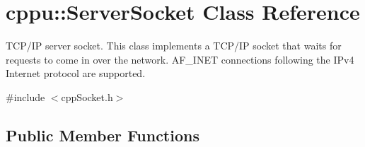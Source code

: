 \hypertarget{classcppu_1_1ServerSocket}{}\section{cppu\+:\+:Server\+Socket Class Reference}
\label{classcppu_1_1ServerSocket}


T\+C\+P/\+I\+P server socket. This class implements a T\+C\+P/\+I\+P socket that waits for requests to come in over the network. A\+F\+\_\+\+I\+N\+E\+T connections following the I\+Pv4 Internet protocol are supported.  




{\ttfamily \#include $<$cpp\+Socket.\+h$>$}

\subsection*{Public Member Functions}
